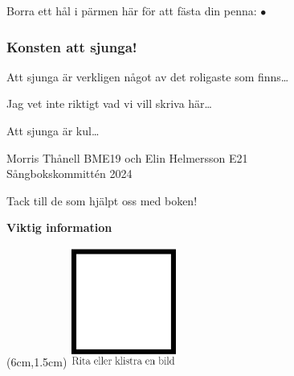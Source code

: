 
Borra ett hål i pärmen här för att fästa din penna: {\Huge $\bullet$}

\subsubsection*{Konsten att sjunga!}
Att sjunga är verkligen något av det roligaste som finns\dots


Jag vet inte riktigt vad vi vill skriva här\dots

Att sjunga är kul\dots



Morris Thånell BME19 och Elin Helmersson E21\\
Sångbokskommittén 2024



\newpage

Tack till de som hjälpt oss med boken!

\newpage

\begin{center}
    \textbf{Viktig information}
\end{center}


\begin{textblock*}{6cm}(6cm,1.5cm) %
  \includegraphics[width=3.5cm]{./bilder/profilbild_stor.png} %
\end{textblock*}

